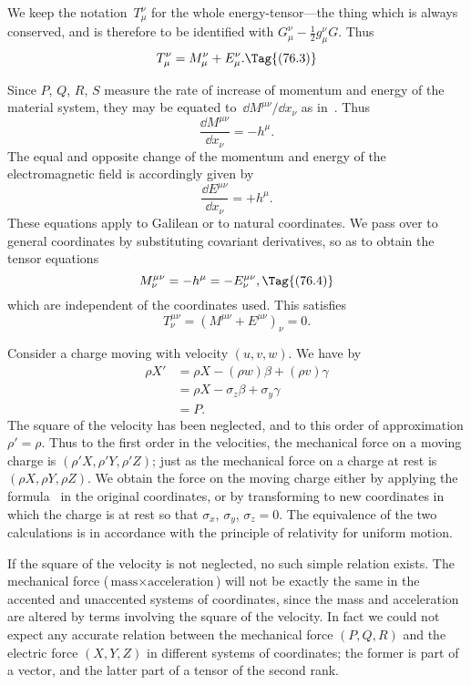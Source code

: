 \documentclass[12pt]{book}
\begin{document}
{\Loosen We keep the notation~$T_{\mu}^{\nu}$ for the whole energy-tensor---the thing which
is always conserved, and is therefore to be identified with $G_{\mu}^{\nu} - \frac{1}{2}g_{\mu}^{\nu}G$. Thus}
\[
T_{\mu}^{\nu} = M_{\mu}^{\nu} + E_{\mu}^{\nu}.
\Tag{(76.3)}
\]

Since $P$, $Q$, $R$, $S$ measure the rate of increase of momentum and energy
of the material system, they may be equated to~$\dd M^{\mu\nu}/\dd x_{\nu}$ as in~. Thus
\[
\frac{\dd M^{\mu\nu}}{\dd x_{\nu}} = -h^{\mu}.
\]
The equal and opposite change of the momentum and energy of the electromagnetic
field is accordingly given by
\[
\frac{\dd E^{\mu\nu}}{\dd x_{\nu}} = +h^{\mu}.
\]
These equations apply to Galilean or to natural coordinates. We pass over to
general coordinates by substituting covariant derivatives, so as to obtain the
tensor equations
\[
M_{\nu}^{\mu\nu} = -h^{\mu} = -E_{\nu}^{\mu\nu},
\Tag{(76.4)}
\]
which are independent of the coordinates used. This satisfies
\[
T_{\nu}^{\mu\nu} = (M^{\mu\nu} + E^{\mu\nu})_{\nu} = 0.
\]

Consider a charge moving with velocity $(u, v, w)$. We have by~
\begin{align*}
  \rho X' &= \rho X - (\rho w)\beta + (\rho v)\gamma \\
  &= \rho X - \sigma_{z}\beta + \sigma_{y}\gamma \\
&= P.
\end{align*}
The square of the velocity has been neglected, and to this order of approximation
$\rho' = \rho$. Thus to the first order in the velocities, the mechanical force on
a moving charge is $(\rho'X, \rho'Y, \rho'Z)$; just as the mechanical force on a charge
at rest is $(\rho X, \rho Y, \rho Z)$. We obtain the force on the moving charge either by
applying the formula~ in the original coordinates, or by transforming to
new coordinates in which the charge is at rest so that $\sigma_{x}$, $\sigma_{y}$, $\sigma_{z} = 0$. The
equivalence of the two calculations is in accordance with the principle of
relativity for uniform motion.

If the square of the velocity is not neglected, no such simple relation
exists. The mechanical force ($\text{mass} \times \text{acceleration}$) will not be exactly the same
in the accented and unaccented systems of coordinates, since the mass and
acceleration are altered by terms involving the square of the velocity. In
fact we could not expect any accurate relation between the mechanical force
$(P, Q, R)$ and the electric force $(X, Y, Z)$ in different systems of coordinates; the
former is part of a vector, and the latter part of a tensor of the second rank.
\end{document}
